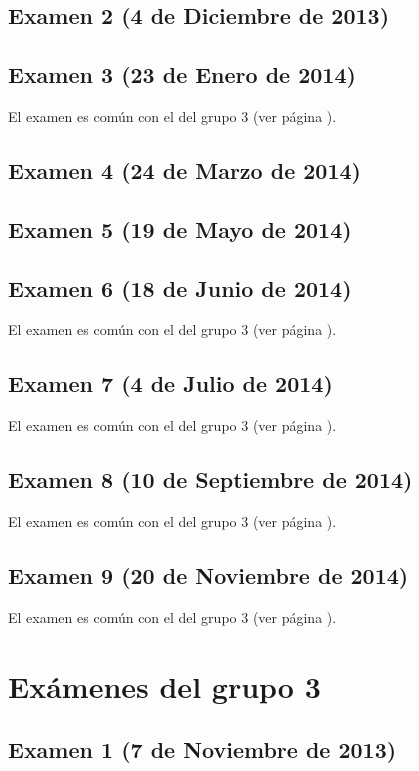 \documentclass[a4paper,12pt,twoside]{book}
\begin{document}
\section{Examen 2 (4 de Diciembre de 2013)}
\section{Examen 3 (23 de Enero de 2014)}
El examen es común con el del grupo 3 (ver página \pageref{examen_13_14_1_3}). 
\section{Examen 4 (24 de Marzo de 2014)}
\section{Examen 5 (19 de Mayo de 2014)}
\section{Examen 6 (18 de Junio de 2014)}
El examen es común con el del grupo 3 (ver página \pageref{examen_13_14_1_6}). 
\section{Examen 7 (4 de Julio de 2014)}
El examen es común con el del grupo 3 (ver página \pageref{examen_13_14_1_7}). 
\section{Examen 8 (10 de Septiembre de 2014)}
El examen es común con el del grupo 3 (ver página \pageref{examen_13_14_1_8}). 
\section{Examen 9 (20 de Noviembre de 2014)}
El examen es común con el del grupo 3 (ver página \pageref{examen_13_14_1_9}). 

\chapter{Exámenes del grupo 3}
\section{Examen 1 (7 de Noviembre de 2013)}
\end{document}
